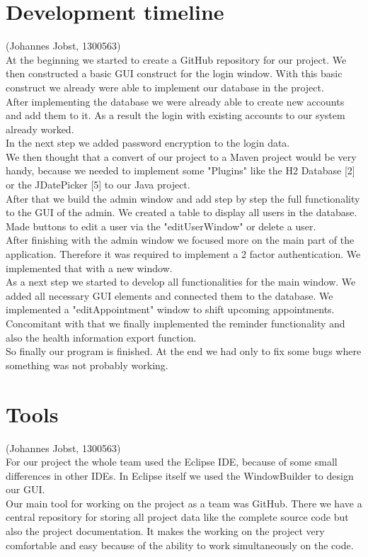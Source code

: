 \documentclass[a4paper, 12pt]{report}
\begin{document}
\section{Development timeline}
{\tiny (Johannes Jobst, 1300563)\\}
At the beginning we started to create a GitHub repository for our project. We then constructed a basic GUI construct for the login window. With this basic construct we already were able to implement our database in the project. \\
After implementing the database we were already able to create new accounts and add them to it. As a result the login with existing accounts to our system already worked. \\
In the next step we added password encryption to the login data. \\
We then thought that a convert of our project to a Maven project would be very handy, because we needed to implement some "Plugins" like the H2 Database [2] or the JDatePicker [5] to our Java project.
\\
After that we build the admin window and add step by step the full functionality to the GUI of the admin. We created a table to display all users in the database. Made buttons to edit a user via the "editUserWindow" or delete a user.
\\
After finishing with the admin window we focused more on the main part of the application. Therefore it was required to implement a 2 factor authentication. We implemented that with a new window.
\\
As a next step we started to develop all functionalities for the main window. We added all necessary GUI elements and connected them to the database. We implemented a "editAppointment" window to shift upcoming appointments. Concomitant with that we finally implemented the reminder functionality and also the health information export function.
\\
So finally our program is finished. At the end we had only to fix some bugs where something was not probably working. 

\section{Tools}
{\tiny (Johannes Jobst, 1300563)\\}
For our project the whole team used the Eclipse IDE, because of some small differences in other IDEs. In Eclipse itself we used the WindowBuilder to design our GUI.\\
Our main tool for working on the project as a team was GitHub. There we have a central repository for storing all project data like the complete source code but also the project documentation. It makes the working on the project very comfortable and easy because of the ability to work simultaneously on the code.
\end{document}
